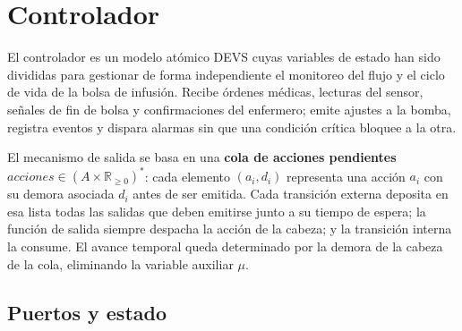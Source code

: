 \documentclass{article}
\begin{document}
\begin{center}
\end{center}
\clearpage

\section{Controlador}

El controlador es un modelo atómico DEVS cuyas variables de estado han sido
divididas para gestionar de forma independiente el monitoreo del flujo y el
ciclo de vida de la bolsa de infusión. Recibe órdenes médicas, lecturas del
sensor, señales de fin de bolsa y confirmaciones del enfermero; emite ajustes
a la bomba, registra eventos y dispara alarmas sin que una condición crítica
bloquee a la otra.

El mecanismo de salida se basa en una \textbf{cola de acciones pendientes}
$\mathit{acciones} \in (A \times \mathbb{R}_{\ge 0})^*$: cada elemento
$(a_i, d_i)$ representa una acción $a_i$ con su demora asociada $d_i$ antes
de ser emitida. Cada transición externa deposita en esa lista todas las
salidas que deben emitirse junto a su tiempo de espera; la función de salida
siempre despacha la acción de la cabeza; y la transición interna la consume.
El avance temporal queda determinado por la demora de la cabeza de la cola,
eliminando la variable auxiliar $\mu$.

\subsection{Puertos y estado}
\end{document}

